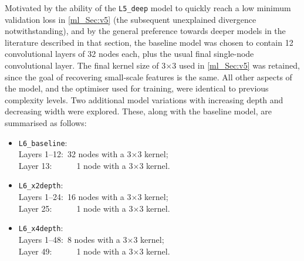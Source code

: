 Motivated by the ability of the \texttt{L5\_deep} model to quickly reach a low minimum validation loss in \autoref{ml_Sec:v5} (the subsequent unexplained divergence notwithstanding), and by the general preference towards deeper models in the literature described in that section, the baseline model was chosen to contain 12 convolutional layers of 32 nodes each, plus the usual final single-node convolutional layer. The final kernel size of 3$\times$3 used in \autoref{ml_Sec:v5} was retained, since the goal of recovering small-scale features is the same. All other aspects of the model, and the optimiser used for training, were identical to previous complexity levels. Two additional model variations with increasing depth and decreasing width were explored. These, along with the baseline model, are summarised as follows:
\begin{itemize}
\item \texttt{L6\_baseline}: \\
\hspace*{1em}Layers 1--12:~32 nodes with a 3$\times$3 kernel; \\
\hspace*{1em}Layer 13:~~~~~~1 node with a 3$\times$3 kernel.
\item \texttt{L6\_x2depth}: \\
\hspace*{1em}Layers 1--24:~16 nodes with a 3$\times$3 kernel; \\
\hspace*{1em}Layer 25:~~~~~~1 node with a 3$\times$3 kernel.
\item \texttt{L6\_x4depth}: \\
\hspace*{1em}Layers 1--48:~8 nodes with a 3$\times$3 kernel; \\
\hspace*{1em}Layer 49:~~~~~~1 node with a 3$\times$3 kernel.
\end{itemize}

